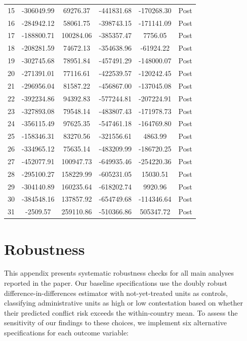 \documentclass[bibtex]{article}
\begin{document}
{\begin{longtable}{cccccc}
15 & -306049.99 & 69276.37 & -441831.68 & -170268.30 & Post \\
16 & -284942.12 & 58061.75 & -398743.15 & -171141.09 & Post \\
17 & -188800.71 & 100284.06 & -385357.47 & 7756.05 & Post \\
18 & -208281.59 & 74672.13 & -354638.96 & -61924.22 & Post \\
19 & -302745.68 & 78951.84 & -457491.29 & -148000.07 & Post \\
20 & -271391.01 & 77116.61 & -422539.57 & -120242.45 & Post \\
21 & -296956.04 & 81587.22 & -456867.00 & -137045.08 & Post \\
22 & -392234.86 & 94392.83 & -577244.81 & -207224.91 & Post \\
23 & -327893.08 & 79548.14 & -483807.43 & -171978.73 & Post \\
24 & -356115.49 & 97625.35 & -547461.18 & -164769.80 & Post \\
25 & -158346.31 & 83270.56 & -321556.61 & 4863.99 & Post \\
26 & -334965.12 & 75635.14 & -483209.99 & -186720.25 & Post \\
27 & -452077.91 & 100947.73 & -649935.46 & -254220.36 & Post \\
28 & -295100.27 & 158229.99 & -605231.05 & 15030.51 & Post \\
29 & -304140.89 & 160235.64 & -618202.74 & 9920.96 & Post \\
30 & -384548.16 & 137857.92 & -654749.68 & -114346.64 & Post \\
31 & -2509.57 & 259110.86 & -510366.86 & 505347.72 & Post \\
\end{longtable}






\section{Robustness}\label{ap:robustness}

This appendix presents systematic robustness checks for all main analyses reported in the paper. Our baseline specifications use the \cite{callaway_santanna2021} doubly robust difference-in-differences estimator with not-yet-treated units as controls, classifying administrative units as high or low contestation based on whether their predicted conflict risk exceeds the within-country mean. To assess the sensitivity of our findings to these choices, we implement six alternative specifications for each outcome variable:

}
\end{document}
